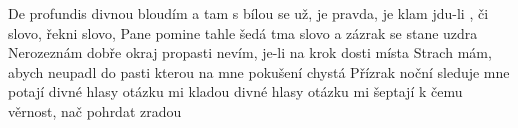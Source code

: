 \begin{TEXT}{De profundis}
\SLOKA {} divnou  bloudím  a tam \NL
{} s bílou  se   \NL
{} už,  je pravda,  je klam  \NL
{} jdu-li , či 
\REFREN  {} slovo, řekni slovo, Pane\NL
{} pomine tahle šedá tma\NL
{} slovo a zázrak se stane \NL
uzdra   
\SLOKA Nerozeznám dobře okraj propasti\NL
nevím, je-li na krok dosti místa\NL
Strach mám, abych neupadl do pasti\NL
kterou na mne pokušení chystá
\SLOKA Přízrak noční sleduje mne potají\NL
divné hlasy otázku mi kladou\NL
divné hlasy otázku mi šeptají\NL
k čemu věrnost, nač pohrdat zradou\NL
\end{TEXT}
